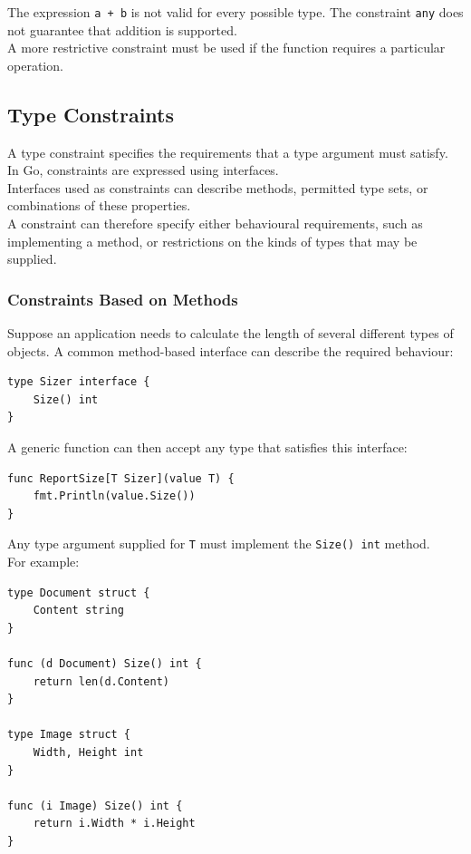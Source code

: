 The expression \texttt{a + b} is not valid for every possible type. The constraint \texttt{any} does not guarantee that addition is supported.\\

A more restrictive constraint must be used if the function requires a particular operation.\\

\subsection{Type Constraints}

A type constraint specifies the requirements that a type argument must satisfy. In Go, constraints are expressed using interfaces.\\

Interfaces used as constraints can describe methods, permitted type sets, or combinations of these properties.\\

A constraint can therefore specify either behavioural requirements, such as implementing a method, or restrictions on the kinds of types that may be supplied.

\subsubsection{Constraints Based on Methods}

Suppose an application needs to calculate the length of several different types of objects. A common method-based interface can describe the required behaviour:

\begin{lstlisting}
type Sizer interface {
    Size() int
}
\end{lstlisting}

A generic function can then accept any type that satisfies this interface:

\begin{lstlisting}
func ReportSize[T Sizer](value T) {
    fmt.Println(value.Size())
}
\end{lstlisting}

Any type argument supplied for \texttt{T} must implement the \texttt{Size() int} method.\\

For example:

\begin{lstlisting}
type Document struct {
    Content string
}

func (d Document) Size() int {
    return len(d.Content)
}

type Image struct {
    Width, Height int
}

func (i Image) Size() int {
    return i.Width * i.Height
}
\end{lstlisting}

